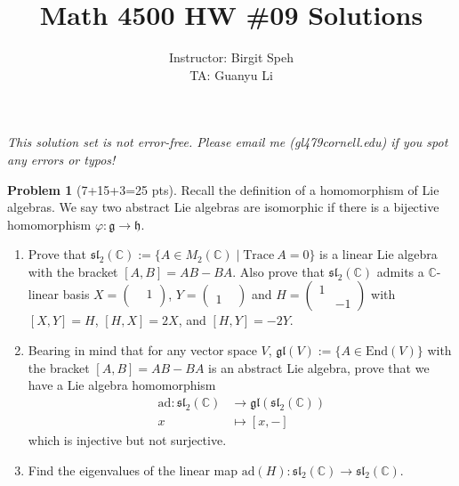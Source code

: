 \documentclass{article}
\title{Math 4500 HW \#09 Solutions}
\author{Instructor: Birgit Speh\\ TA: Guanyu Li}
\date{}
\theoremstyle{definition}
\newtheorem{problem}{Problem}
\theoremstyle{plain}
\begin{document}
\maketitle\par

\emph{This solution set is not error-free. Please email me (gl479\MVAt cornell.edu) if you spot any errors or typos!}

\begin{problem}[7+15+3=25 pts]
Recall the definition of a homomorphism of  Lie algebras. We say two abstract Lie algebras are isomorphic if there is a bijective homomorphism $\varphi:\mathfrak{g}\to\mathfrak{h}$.
\begin{enumerate}
\item Prove that $\mathfrak{sl}_2(\mathbb{C}):=\{A\in M_2(\mathbb{C})\mid \mathrm{Trace}~A=0\}$ is a linear Lie algebra with the bracket $[A,B]=AB-BA$. Also prove that $\mathfrak{sl}_2(\mathbb{C})$ admits a $\mathbb{C}$-linear basis $X=\begin{pmatrix}&1\\ &\end{pmatrix}$, $Y=\begin{pmatrix}&\\ 1&\end{pmatrix}$ and $H=\begin{pmatrix}1&\\ &-1\end{pmatrix}$ with $[X,Y]=H$, $[H,X]=2X$, and $[H,Y]=-2Y$.
\item Bearing in mind that for any vector space $V$, $\mathfrak{gl}(V):=\{A\in\mathrm{End}(V)\}$ with the bracket $[A,B]=AB-BA$ is an abstract Lie algebra, prove that we have a Lie algebra homomorphism
\begin{align*}
\mathrm{ad}:\mathfrak{sl}_2(\mathbb{C})&\to\mathfrak{gl}(\mathfrak{sl}_2(\mathbb{C}))\\
x&\mapsto[x,-]
\end{align*}
which is injective but not surjective.
\item Find the eigenvalues of the linear map $\mathrm{ad}(H):\mathfrak{sl}_2(\mathbb{C})\to\mathfrak{sl}_2(\mathbb{C})$.
\end{enumerate}
\end{problem}
\end{document}

